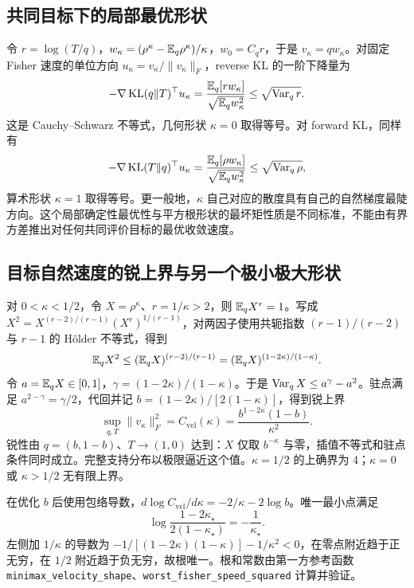 \subsection{共同目标下的局部最优形状}

令 $r=\log(T/q)$，$w_\kappa=(\rho^\kappa-\mathbb E_q\rho^\kappa)/\kappa$，$w_0=C_qr$，于是 $v_\kappa=qw_\kappa$。对固定 Fisher 速度的单位方向 $u_\kappa=v_\kappa/\|v_\kappa\|_F$，reverse KL 的一阶下降量为
\begin{equation}
 -\nabla\operatorname{KL}(q\Vert T)^\top u_\kappa
 =\frac{\mathbb E_q[rw_\kappa]}{\sqrt{\mathbb E_qw_\kappa^2}}
 \le\sqrt{\operatorname{Var}_qr}.
\end{equation}
这是 Cauchy--Schwarz 不等式，几何形状 $\kappa=0$ 取得等号。对 forward KL，同样有
\begin{equation}
 -\nabla\operatorname{KL}(T\Vert q)^\top u_\kappa
 =\frac{\mathbb E_q[\rho w_\kappa]}{\sqrt{\mathbb E_qw_\kappa^2}}
 \le\sqrt{\operatorname{Var}_q\rho},
\end{equation}
算术形状 $\kappa=1$ 取得等号。更一般地，$\kappa$ 自己对应的散度具有自己的自然梯度最陡方向。这个局部确定性最优性与平方根形状的最坏矩性质是不同标准，不能由有界方差推出对任何共同评价目标的最优收敛速度。
\subsection{目标自然速度的锐上界与另一个极小极大形状}

对 $0<\kappa<1/2$，令 $X=\rho^\kappa$、$r=1/\kappa>2$，则 $\mathbb E_qX^r=1$。写成 $X^2=X^{(r-2)/(r-1)}(X^r)^{1/(r-1)}$，对两因子使用共轭指数 $(r-1)/(r-2)$ 与 $r-1$ 的 Hölder 不等式，得到
\begin{equation}
 \mathbb E_qX^2\le(\mathbb E_qX)^{(r-2)/(r-1)}
 =(\mathbb E_qX)^{(1-2\kappa)/(1-\kappa)}.
\end{equation}
令 $a=\mathbb E_qX\in[0,1]$，$\gamma=(1-2\kappa)/(1-\kappa)$。于是 $\operatorname{Var}_qX\le a^\gamma-a^2$。驻点满足 $a^{2-\gamma}=\gamma/2$，代回并记 $b=(1-2\kappa)/[2(1-\kappa)]$，得到锐上界
\begin{equation}
 \boxed{\sup_{q,T}\|v_\kappa\|_F^2
 =C_{\mathrm{vel}}(\kappa)
 =\frac{b^{1-2\kappa}(1-b)}{\kappa^2}}.
\end{equation}
锐性由 $q=(b,1-b)$、$T\to(1,0)$ 达到：$X$ 仅取 $b^{-\kappa}$ 与零，插值不等式和驻点条件同时成立。完整支持分布以极限逼近这个值。$\kappa=1/2$ 的上确界为 4；$\kappa=0$ 或 $\kappa>1/2$ 无有限上界。

在优化 $b$ 后使用包络导数，$d\log C_{\mathrm{vel}}/d\kappa=-2/\kappa-2\log b$。唯一最小点满足
\begin{equation}
 \log\frac{1-2\kappa_\star}{2(1-\kappa_\star)}=-\frac1{\kappa_\star}.
\end{equation}
左侧加 $1/\kappa$ 的导数为 $-1/[(1-2\kappa)(1-\kappa)]-1/\kappa^2<0$，在零点附近趋于正无穷，在 $1/2$ 附近趋于负无穷，故根唯一。根和常数由第一方参考函数 \texttt{minimax\_velocity\_shape}、\texttt{worst\_fisher\_speed\_squared} 计算并验证。

